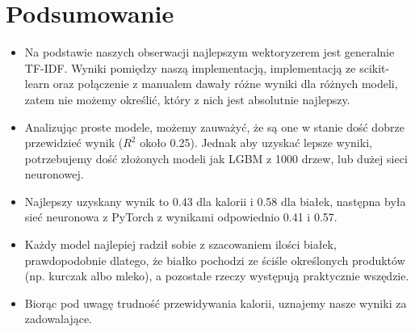 \documentclass[12pt,a4paper]{article}
\begin{document}
\section*{Podsumowanie}
\begin{itemize}
    \item Na podstawie naszych obserwacji najlepszym wektoryzerem jest generalnie TF-IDF. Wyniki pomiędzy naszą implementacją, implementacją ze scikit-learn oraz połączenie z manualem dawały różne wyniki dla różnych modeli, zatem nie możemy określić, który z nich jest absolutnie najlepszy. 
    \item Analizując proste modele, możemy zauważyć, że są one w stanie dość dobrze przewidzieć wynik ($R^2$ około 0.25). Jednak aby uzyskać lepsze wyniki, potrzebujemy dość złożonych modeli jak LGBM z 1000 drzew, lub dużej sieci neuronowej. 
    \item Najlepszy uzyskany wynik to 0.43 dla kalorii i 0.58 dla białek, następna była sieć neuronowa z PyTorch z wynikami odpowiednio 0.41 i 0.57. 
    \item Każdy model najlepiej radził sobie z szacowaniem ilości białek, prawdopodobnie dlatego, że białko pochodzi ze ściśle określonych produktów (np. kurczak albo mleko), a pozostałe rzeczy występują praktycznie wszędzie. 
    \item Biorąc pod uwagę trudność przewidywania kalorii, uznajemy nasze wyniki za zadowalające.
\end{itemize}    
\end{document}

